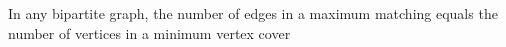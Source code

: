 In any bipartite graph, the number of edges in a maximum matching equals
the number of vertices in a minimum vertex cover

